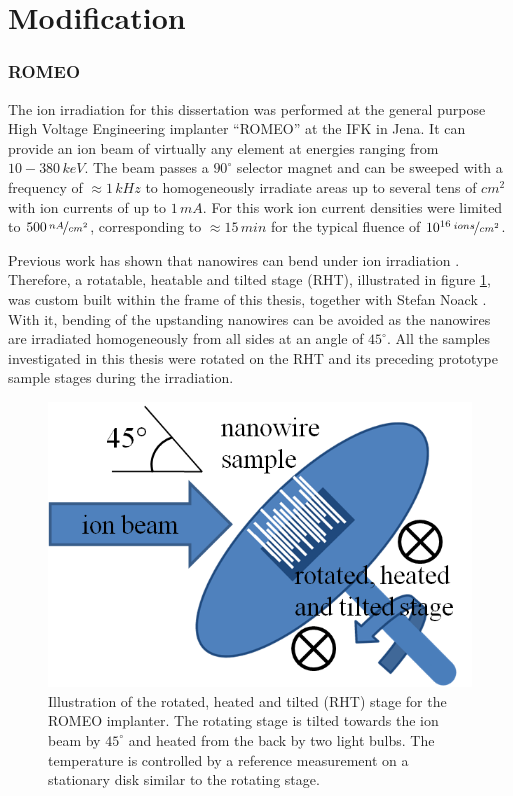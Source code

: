 
\section{Modification}


\subsubsection{ROMEO}


The ion irradiation for this dissertation was performed at the general purpose High Voltage Engineering implanter ``ROMEO'' at the IFK in Jena. It can provide an ion beam of virtually any element at energies ranging from $10-380\,keV$. The beam passes a $90^\circ$ selector magnet and can be sweeped with a frequency of $\approx 1\,kHz$ to homogeneously irradiate areas up to several tens of $cm^2$ with ion currents of up to $1\,mA$. For this work ion current densities were limited to $500\,\nicefrac{nA}{cm^2}$, corresponding to $\approx 15\,min$ for the typical fluence of $10^{16}\,\nicefrac{ions}{cm^2}$.

Previous work has shown that nanowires can bend under ion irradiation \cite{borschel_permanent_2011, borschel_ion-solid_2012}. Therefore, a rotatable, heatable and tilted stage (RHT), illustrated in figure \ref{RHT}, was custom built within the frame of this thesis, together with Stefan Noack \cite{noack_sputter_2014}. With it, bending of the upstanding nanowires can be avoided as the nanowires are irradiated homogeneously from all sides at an angle of $45^\circ$. All the samples investigated in this thesis were rotated on the RHT and its preceding prototype sample stages during the irradiation. 

\begin{figure}
	\centering
		\includegraphics[width=.5\textwidth]{images/RHT.png}
	\caption{ Illustration of the rotated, heated and tilted (RHT) stage for the ROMEO implanter. The rotating stage is tilted towards the ion beam by $45^\circ$ and heated from the back by two light bulbs. The temperature is controlled by a reference measurement on a stationary disk similar to the rotating stage.}
	\label{RHT}
\end{figure} 

